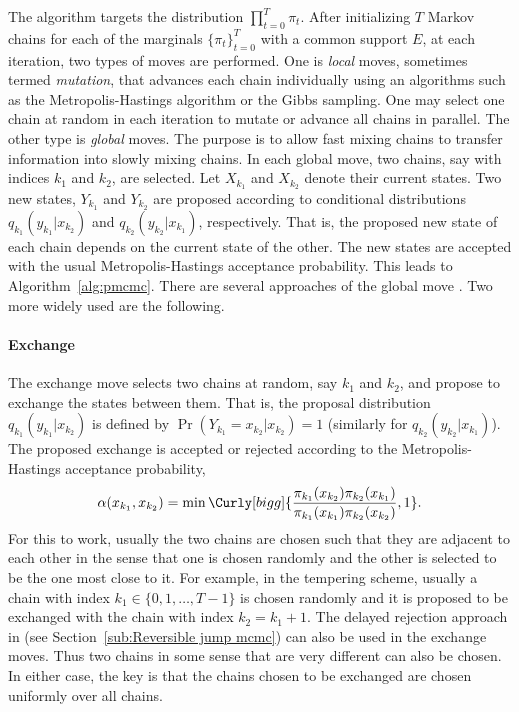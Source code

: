 The algorithm targets the distribution $\prod_{t=0}^T\pi_t$. After
initializing $T$ Markov chains for each of the marginals $\{\pi_t\}_{t=0}^T$
with a common support $E$, at each iteration, two types of moves are
performed. One is \emph{local} moves, sometimes termed \emph{mutation}, that
advances each chain individually using an \mcmc algorithms such as the
Metropolis-Hastings algorithm or the Gibbs sampling. One may select one chain
at random in each iteration to mutate or advance all chains in parallel. The
other type is \emph{global} moves. The purpose is to allow fast mixing chains
to transfer information into slowly mixing chains. In each global move, two
chains, say with indices $k_1$ and $k_2$, are selected. Let $X_{k_1}$ and
$X_{k_2}$ denote their current states. Two new states, $Y_{k_1}$ and
$Y_{k_2}$ are proposed according to conditional distributions
$q_{k_1}(y_{k_1}|x_{k_2})$ and $q_{k_2}(y_{k_2}|x_{k_1})$, respectively. That
is, the proposed new state of each chain depends on the current state of the
other. The new states are accepted with the usual Metropolis-Hastings
acceptance probability. This leads to Algorithm~\ref{alg:pmcmc}. There are
several approaches of the global move \cite{Jasra:2007in}. Two more widely
used are the following.



\paragraph{Exchange}

The exchange move selects two chains at random, say $k_1$ and $k_2$, and
propose to exchange the states between them. That is, the proposal
distribution $q_{k_1}(y_{k_1}|x_{k_2})$ is defined by
$\Pr(Y_{k_1}=x_{k_2}|x_{k_2}) = 1$ (similarly for
$q_{k_2}(y_{k_2}|x_{k_1})$). The proposed exchange is accepted or rejected
according to the Metropolis-Hastings acceptance probability,
\begin{equation}
  \alpha(x_{k_1}, x_{k_2}) =
  \min\Curly[bigg]{
  \frac{\pi_{k_1}(x_{k_2})\pi_{k_2}(x_{k_1})}
  {\pi_{k_1}(x_{k_1})\pi_{k_2}(x_{k_2})}, 1}.
  \label{eq:exchange accept}
\end{equation}
For this to work, usually the two chains are chosen such that they are
adjacent to each other in the sense that one is chosen randomly and the other
is selected to be the one most close to it. For example, in the tempering
scheme, usually a chain with index $k_1 \in\{0,1,\dots,T-1\}$ is chosen
randomly and it is proposed to be exchanged with the chain with index $k_2 =
k_1 + 1$. The delayed rejection approach in \cite{Green:2001tk} (see
Section~\ref{sub:Reversible jump mcmc}) can also be used in the exchange
moves. Thus two chains in some sense that are very different can also be
chosen. In either case, the key is that the chains chosen to be exchanged are
chosen uniformly over all chains.

